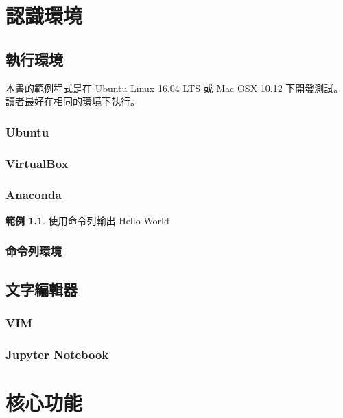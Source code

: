 \documentclass[a4paper,12pt]{book}
\theoremstyle{definition}
\newtheorem{example}{範例}[chapter]
\begin{document}
\mainmatter

\part{認識環境}
%
\label{p:environment}

\chapter{執行環境}
%
\label{c:runtime}

本書的範例程式是在 Ubuntu Linux 16.04 LTS 或 Mac OSX 10.12 下開發測試。
讀者最好在相同的環境下執行。

\section{Ubuntu}

\section{VirtualBox}

\section{Anaconda}

\begin{example}
使用命令列輸出 Hello World
\end{example}

\section{命令列環境}

\chapter{文字編輯器}
%
\label{c:editor}

\section{VIM}

\section{Jupyter Notebook}

\part{核心功能}
%
\label{p:core}
\end{document}
